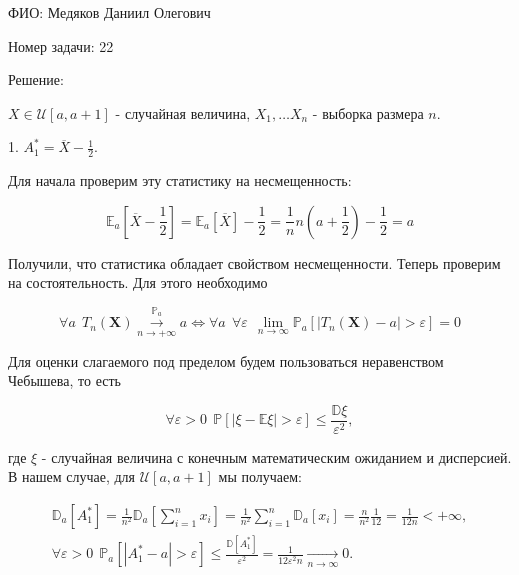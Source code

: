 \documentclass[14pt]{extarticle}
\begin{document}
ФИО: Медяков Даниил Олегович

\vspace{10pt}

Номер задачи: 22

\vspace{10pt}

Решение:

\vspace{10pt}

$X\in \mathcal{U}[a, a+1]$ - случайная величина, $X_1, \ldots X_n$ - выборка размера $n$.

1. $A_1^* = \overline{X} - \frac{1}{2}$. 

Для начала проверим эту статистику на несмещенность:

\begin{equation*}
    \mathbb E_a \left[\overline{X} - \frac{1}{2}\right] = \mathbb E_a \left[\overline{X}\right] - \frac{1}{2} = \frac{1}{n}n\left(a + \frac{1}{2}\right) - \frac{1}{2} = a
\end{equation*}

Получили, что статистика обладает свойством несмещенности. Теперь проверим на состоятельность. Для этого необходимо

\begin{equation*}
    \forall a~~ T_n(\textbf{X})\overset{\mathbb P_a}{\underset{n\rightarrow+\infty}{\longrightarrow}}a \Leftrightarrow \forall a~~\forall\varepsilon~~ \underset{n\rightarrow\infty}{\lim} \mathbb P_a\left[|T_n(\textbf{X}) - a| > \varepsilon\right] = 0
\end{equation*}

Для оценки слагаемого под пределом будем пользоваться неравенством Чебышева, то есть

\begin{equation*}
    \forall \varepsilon > 0 ~~\mathbb P\left[|\xi - \mathbb E\xi| > \varepsilon\right] \leqslant \frac{\mathbb D\xi}{\varepsilon^2},
\end{equation*}

где $\xi$ - случайная величина с конечным математическим ожиданием и дисперсией. В нашем случае, для $\mathcal{U}[a, a+1]$ мы получаем:

\begin{gather*}
    \mathbb D_a[A_1^*] = \frac{1}{n^2}\mathbb D_a\left[\sum\limits_{i=1}^n x_i\right] = \frac{1}{n^2}\sum\limits_{i=1}^n \mathbb D_a[x_i] = \frac{n}{n^2}\frac{1}{12} = \frac{1}{12n} < +\infty,\\
    \forall \varepsilon > 0 ~~ \mathbb P_a[|A_1^* - a| > \varepsilon] \leqslant \frac{\mathbb D[A_1^*]}{\varepsilon^2} = \frac{1}{12\varepsilon^2n}\underset{n\rightarrow\infty}{\longrightarrow}0.
\end{gather*}
\end{document}
